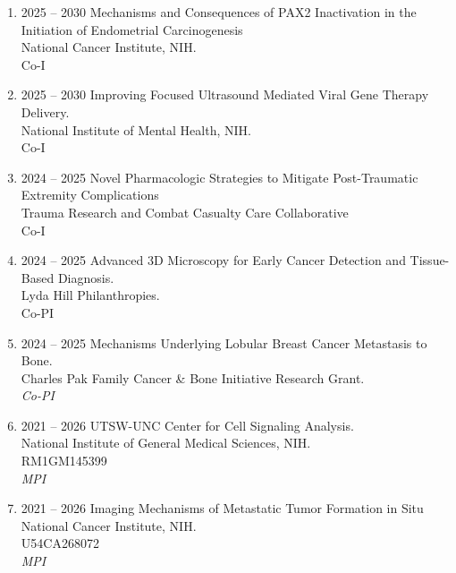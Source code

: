 \begin{enumerate}
[leftmargin=!,
labelindent=0pt,
itemindent=-66pt,
label=\textbullet]

\item 2025 -- 2030 
\hspace{8pt}
Mechanisms and Consequences of PAX2 Inactivation in the Initiation of Endometrial Carcinogenesis \\
National Cancer Institute, NIH. \\
Co-I \\ 


\item 2025 -- 2030 
\hspace{8pt}
Improving Focused Ultrasound Mediated Viral Gene Therapy Delivery. \\
National Institute of Mental Health, NIH. \\
Co-I \\ 


\item 2024 -- 2025 
\hspace{8pt}
Novel Pharmacologic Strategies to Mitigate Post-Traumatic Extremity Complications \\
Trauma Research and Combat Casualty Care Collaborative \\
Co-I \\ 

\item 2024 -- 2025 
\hspace{8pt}
Advanced 3D Microscopy for Early Cancer Detection and Tissue-Based Diagnosis. \\
Lyda Hill Philanthropies. \\
Co-PI \\ 

\item 2024 -- 2025 
\hspace{8pt}
Mechanisms Underlying Lobular Breast Cancer Metastasis to Bone. \\
Charles Pak Family Cancer \& Bone Initiative Research Grant. \\
{\it Co-PI}


\item 2021 -- 2026 
\hspace{8pt}
UTSW-UNC Center for Cell Signaling Analysis. \\
National Institute of General Medical Sciences, NIH. \\
RM1GM145399 \\ 
{\it MPI}

\item 2021 -- 2026 
\hspace{8pt}
Imaging Mechanisms of Metastatic Tumor Formation in Situ \\
National Cancer Institute, NIH. \\
U54CA268072 \\ 
{\it MPI}

\end{enumerate}

